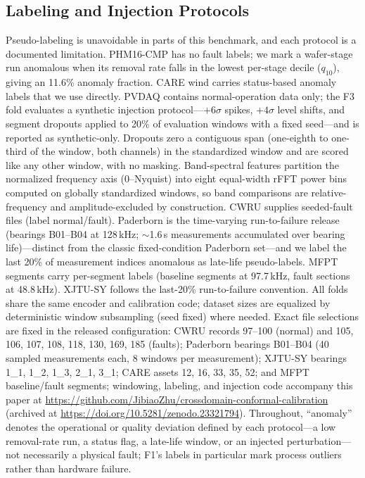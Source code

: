 \subsection{Labeling and Injection Protocols}
\label{sec:protocols}
Pseudo-labeling is unavoidable in parts of this benchmark, and each protocol is a documented limitation. PHM16-CMP \cite{phm2016} has no fault labels; we mark a wafer-stage run anomalous when its removal rate falls in the lowest per-stage decile ($q_{10}$), giving an 11.6\% anomaly fraction. CARE wind \cite{care2024} carries status-based anomaly labels that we use directly. PVDAQ \cite{pvdaq} contains normal-operation data only; the F3 fold evaluates a synthetic injection protocol---$+6\sigma$ spikes, $+4\sigma$ level shifts, and segment dropouts applied to 20\% of evaluation windows with a fixed seed---and is reported as synthetic-only. Dropouts zero a contiguous span (one-eighth to one-third of the window, both channels) in the standardized window and are scored like any other window, with no masking. Band-spectral features partition the normalized frequency axis ($0$--Nyquist) into eight equal-width rFFT power bins computed on globally standardized windows, so band comparisons are relative-frequency and amplitude-excluded by construction. CWRU supplies seeded-fault files (label normal/fault). Paderborn \cite{paderborn} is the time-varying run-to-failure release (bearings B01--B04 at 128\,kHz; $\sim$1.6\,s measurements accumulated over bearing life)---distinct from the classic fixed-condition Paderborn set---and we label the last 20\% of measurement indices anomalous as late-life pseudo-labels. MFPT segments carry per-segment labels (baseline segments at 97.7\,kHz, fault sections at 48.8\,kHz). XJTU-SY \cite{wang2020} follows the last-20\% run-to-failure convention. All folds share the same encoder and calibration code; dataset sizes are equalized by deterministic window subsampling (seed fixed) where needed. Exact file selections are fixed in the released configuration: CWRU records 97--100 (normal) and 105, 106, 107, 108, 118, 130, 169, 185 (faults); Paderborn bearings B01--B04 (40 sampled measurements each, 8 windows per measurement); XJTU-SY bearings 1\_1, 1\_2, 1\_3, 2\_1, 3\_1; CARE assets 12, 16, 33, 35, 52; and MFPT baseline/fault segments; windowing, labeling, and injection code accompany this paper at \url{https://github.com/JibiaoZhu/crossdomain-conformal-calibration} (archived at \url{https://doi.org/10.5281/zenodo.23321794}). Throughout, ``anomaly'' denotes the operational or quality deviation defined by each protocol---a low removal-rate run, a status flag, a late-life window, or an injected perturbation---not necessarily a physical fault; F1's labels in particular mark process outliers rather than hardware failure.

